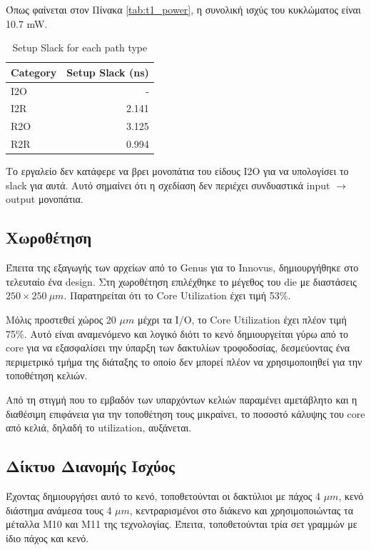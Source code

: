 Όπως φαίνεται στον Πίνακα \ref{tab:t1_power}, η συνολική ισχύς του κυκλώματος είναι 10.7 mW.
\begin{table}[H]
    \centering
    \caption{Setup Slack for each path type}
    \label{tab:t1_slack}
    \begin{tabular}{lr}
        \toprule
        Category & Setup Slack (ns) \\
        \midrule
        I2O & - \\
        I2R & 2.141 \\
        R2O & 3.125 \\
        R2R & 0.994 \\
        \bottomrule
    \end{tabular}
\end{table}

Το εργαλείο δεν κατάφερε να βρει μονοπάτια του είδους I2O για να υπολογίσει το slack για αυτά.
Αυτό σημαίνει ότι η σχεδίαση δεν περιέχει συνδυαστικά input $\rightarrow$ output μονοπάτια.

\subsection{Χωροθέτηση}

Έπειτα της εξαγωγής των αρχείων από το Genus για το Innovus, δημιουργήθηκε στο τελευταίο ένα design.
Στη χωροθέτηση επιλέχθηκε το μέγεθος του die με διαστάσεις $250\times250~\mu m$. Παρατηρείται ότι το Core Utilization έχει τιμή 53\%.

Μόλις προστεθεί χώρος 20 $\mu m$ μέχρι τα I/O, το Core Utilization έχει πλέον τιμή 75\%.
Αυτό είναι αναμενόμενο και λογικό διότι το κενό δημιουργείται γύρω από το core για να εξασφαλίσει την ύπαρξη των δακτυλίων τροφοδοσίας, δεσμεύοντας ένα περιμετρικό τμήμα της διάταξης το οποίο δεν μπορεί πλέον να χρησιμοποιηθεί για την τοποθέτηση κελιών.

Από τη στιγμή που το εμβαδόν των υπαρχόντων κελιών παραμένει αμετάβλητο και η διαθέσιμη επιφάνεια για την τοποθέτηση τους μικραίνει, το ποσοστό κάλυψης του core από κελιά, δηλαδή το utilization, αυξάνεται.

\subsection{Δίκτυο Διανομής Ισχύος}

Έχοντας δημιουργήσει αυτό το κενό, τοποθετούνται οι δακτύλιοι με πάχος 4 $\mu m$, κενό διάστημα ανάμεσα τους 4 $\mu m$, κεντραρισμένοι στο διάκενο και χρησιμοποιώντας τα μέταλλα M10 και M11 της τεχνολογίας.
Έπειτα, τοποθετούνται τρία σετ γραμμών με ίδιο πάχος και κενό.

